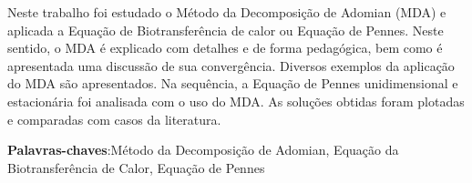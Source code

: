 \begin{resumo}
Neste trabalho foi estudado o Método da Decomposição de Adomian (MDA) e aplicada a Equação de Biotransferência de calor ou Equação de Pennes. Neste sentido, o MDA é explicado com detalhes e de forma pedagógica, bem como é apresentada uma discussão de sua convergência. Diversos exemplos da aplicação do MDA são apresentados. Na sequência, a Equação de Pennes unidimensional e estacionária foi analisada com o uso do MDA. As soluções obtidas foram plotadas e comparadas com casos da literatura.



 \vspace{\onelineskip}
    
 \noindent
 \textbf{Palavras-chaves}:Método da Decomposição de Adomian, Equação da Biotransferência de Calor, Equação de Pennes

\end{resumo}
